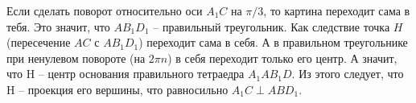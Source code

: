 Если сделать поворот относительно оси $A_1C$ на $\pi/3$, то картина переходит сама в тебя. Это значит, что $AB_1D_1$ -- правильный треугольник. Как следствие точка $H$ (пересечение $AC$ с $AB_1D_1$) переходит сама в себя. А в правильном треугольнике при ненулевом повороте (на $2\pi n$) в себя переходит только его центр. А значит, что H -- центр основания правильного тетраедра $A_1AB_1D$. Из этого следует, что H -- проекция его вершины, что равносильно $A_1C\perp ABD_1$.